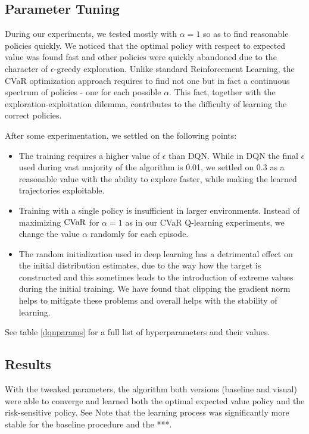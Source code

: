 \subsection{Parameter Tuning}
During our experiments, we tested mostly with $\alpha=1$ so as to find reasonable policies quickly. We noticed that the optimal policy with respect to expected value was found fast and other policies were quickly abandoned due to the character of $\epsilon$-greedy exploration. Unlike standard Reinforcement Learning, the CVaR optimization approach requires to find not one but in fact a continuous spectrum of policies - one for each possible $\alpha$. 
This fact, together with the exploration-exploitation dilemma, contributes to the difficulty of learning the correct policies.

After some experimentation, we settled on the following points: 

\begin{itemize}
\item The training requires a higher value of $\epsilon$ than DQN. While in DQN the final $\epsilon$ used during vast majority of the algorithm is 0.01, we settled on $0.3$ as a reasonable value with the ability to explore faster, while making the learned trajectories exploitable.

\item Training with a single policy is insufficient in larger environments. Instead of maximizing $\text{CVaR}$ for $\alpha=1$ as in our CVaR Q-learning experiments, we change the value $\alpha$ randomly for each episode.

\item The random initialization used in deep learning has a detrimental effect on the initial distribution estimates, due to the way how the target is constructed and this sometimes leads to the introduction of extreme values during the initial training. We have found that clipping the gradient norm helps to mitigate these problems and overall helps with the stability of learning.
\end{itemize}

See table \ref{dqnparams} for a full list of hyperparameters and their values.

\subsection{Results}

With the tweaked parameters, the algorithm both versions (baseline and visual) were able to converge and learned both the optimal expected value policy and the risk-sensitive policy. See  Note that the learning process was significantly more stable for the baseline procedure and the ***.

